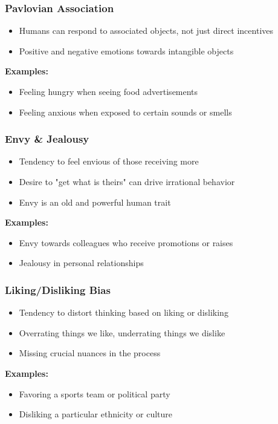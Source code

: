 \begin{frame}[fragile]\frametitle{Pavlovian Association}
\begin{itemize}
    \item Humans can respond to associated objects, not just direct incentives
    \item Positive and negative emotions towards intangible objects
\end{itemize}
\textbf{Examples:}
\begin{itemize}
    \item Feeling hungry when seeing food advertisements
    \item Feeling anxious when exposed to certain sounds or smells
\end{itemize}
\end{frame}

\begin{frame}[fragile]\frametitle{Envy \& Jealousy}
\begin{itemize}
    \item Tendency to feel envious of those receiving more
    \item Desire to "get what is theirs" can drive irrational behavior
    \item Envy is an old and powerful human trait
\end{itemize}
\textbf{Examples:}
\begin{itemize}
    \item Envy towards colleagues who receive promotions or raises
    \item Jealousy in personal relationships
\end{itemize}
\end{frame}

\begin{frame}[fragile]\frametitle{Liking/Disliking Bias}
\begin{itemize}
    \item Tendency to distort thinking based on liking or disliking
    \item Overrating things we like, underrating things we dislike
    \item Missing crucial nuances in the process
\end{itemize}
\textbf{Examples:}
\begin{itemize}
    \item Favoring a sports team or political party
    \item Disliking a particular ethnicity or culture
\end{itemize}
\end{frame}